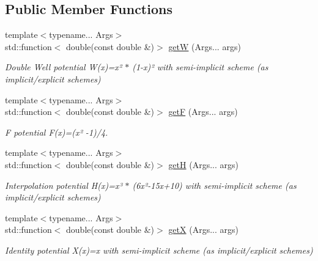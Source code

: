 \subsection*{Public Member Functions}
\begin{DoxyCompactItemize}
\item 
{\footnotesize template$<$typename... Args$>$ }\\std\+::function$<$ double(const double \&)$>$ \hyperlink{structpotential__function_3_010_00_01ThermodynamicsPotentialDiscretization_1_1SemiImplicit_01_4_afb01c48fefb8549b46f1df57dee9e19e}{getW} (Args... args)
\begin{DoxyCompactList}\small\item\em Double Well potential W(x)=x² $\ast$ (1-\/x)² with semi-\/implicit scheme (as implicit/explicit schemes) \end{DoxyCompactList}\item 
{\footnotesize template$<$typename... Args$>$ }\\std\+::function$<$ double(const double \&)$>$ \hyperlink{structpotential__function_3_010_00_01ThermodynamicsPotentialDiscretization_1_1SemiImplicit_01_4_a9bb69d00c5351b45d864fb056650cd1f}{getF} (Args... args)
\begin{DoxyCompactList}\small\item\em F potential F(x)=(x² -\/1)/4. \end{DoxyCompactList}\item 
{\footnotesize template$<$typename... Args$>$ }\\std\+::function$<$ double(const double \&)$>$ \hyperlink{structpotential__function_3_010_00_01ThermodynamicsPotentialDiscretization_1_1SemiImplicit_01_4_a04b03e529ffbac36d76a9dcd1353c61e}{getH} (Args... args)
\begin{DoxyCompactList}\small\item\em Interpolation potential H(x)=x³ $\ast$ (6x²-\/15x+10) with semi-\/implicit scheme (as implicit/explicit schemes) \end{DoxyCompactList}\item 
{\footnotesize template$<$typename... Args$>$ }\\std\+::function$<$ double(const double \&)$>$ \hyperlink{structpotential__function_3_010_00_01ThermodynamicsPotentialDiscretization_1_1SemiImplicit_01_4_a9c2d3c673cbe8c37d3e9c46820a7ea78}{getX} (Args... args)
\begin{DoxyCompactList}\small\item\em Identity potential X(x)=x with semi-\/implicit scheme (as implicit/explicit schemes) \end{DoxyCompactList}\end{DoxyCompactItemize}


